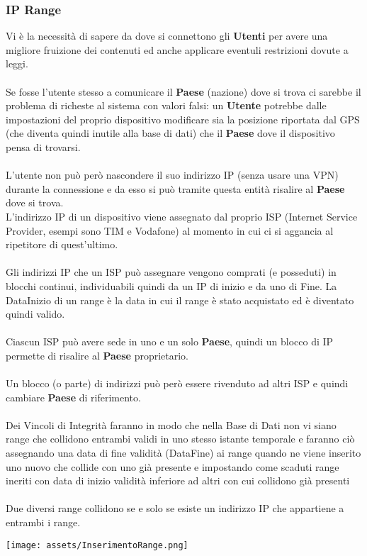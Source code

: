 \documentclass{article}
\begin{document}
\subsubsection{IP Range}
Vi è la necessità di sapere da dove si connettono gli \textbf{Utenti} per avere una migliore fruizione dei contenuti ed anche applicare eventuli restrizioni dovute a leggi.
\\
\\
Se fosse l'utente stesso a comunicare il \textbf{Paese} (nazione) dove si trova ci sarebbe il problema di richeste al sistema con valori falsi: un \textbf{Utente} potrebbe dalle impostazioni del proprio dispositivo modificare sia la posizione riportata dal GPS (che diventa quindi inutile alla base di dati) che il \textbf{Paese} dove il dispositivo pensa di trovarsi.
\\
\\
L'utente non può però nascondere il suo indirizzo IP (senza usare una VPN) durante la connessione e da esso si può tramite questa entità risalire al \textbf{Paese} dove si trova.
\\
L'indirizzo IP di un dispositivo viene assegnato dal proprio ISP (Internet Service Provider, esempi sono TIM e Vodafone) al momento in cui ci si aggancia al ripetitore di quest'ultimo.
\\
\\
Gli indirizzi IP che un ISP può assegnare vengono comprati (e posseduti) in blocchi continui, individuabili quindi da un IP di inizio e da uno di Fine. La DataInizio di un range è la data in cui il range è stato acquistato ed è diventato quindi valido.
\\
\\
Ciascun ISP può avere sede in uno e un solo \textbf{Paese}, quindi un blocco di IP permette di risalire al \textbf{Paese} proprietario.
\\
\\
%
%
%
%
%
%
%
%
Un blocco (o parte) di indirizzi può però essere rivenduto ad altri ISP e quindi cambiare \textbf{Paese} di riferimento.
\\
\\
Dei Vincoli di Integrità faranno in modo che nella Base di Dati non vi siano range che collidono entrambi validi in uno stesso istante temporale e faranno ciò assegnando una data di fine validità (DataFine) ai range quando ne viene inserito uno nuovo che collide con uno già presente e impostando come scaduti range ineriti con data di inizio validità inferiore ad altri con cui collidono già presenti
\\
\\
Due diversi range collidono se e solo se esiste un indirizzo IP che appartiene a entrambi i range.
\\
\begin{center}
    \centering
    \texttt{[image: assets/InserimentoRange.png]}
    \label{Il primo Range (Italia) viene svalidato quando viene inserito il secondo (Spagna) che si sovrappone ad esso}
\end{center}
\end{document}
